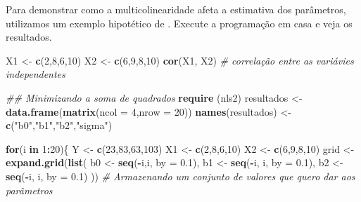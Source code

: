 \documentclass[
]{book}
\newenvironment{Shaded}{\begin{snugshade}}{\end{snugshade}}
\newcommand{\CommentTok}[1]{\textcolor[rgb]{0.56,0.35,0.01}{\textit{#1}}}
\newcommand{\ControlFlowTok}[1]{\textcolor[rgb]{0.13,0.29,0.53}{\textbf{#1}}}
\newcommand{\DataTypeTok}[1]{\textcolor[rgb]{0.13,0.29,0.53}{#1}}
\newcommand{\DecValTok}[1]{\textcolor[rgb]{0.00,0.00,0.81}{#1}}
\newcommand{\FloatTok}[1]{\textcolor[rgb]{0.00,0.00,0.81}{#1}}
\newcommand{\KeywordTok}[1]{\textcolor[rgb]{0.13,0.29,0.53}{\textbf{#1}}}
\newcommand{\NormalTok}[1]{#1}
\newcommand{\OperatorTok}[1]{\textcolor[rgb]{0.81,0.36,0.00}{\textbf{#1}}}
\newcommand{\StringTok}[1]{\textcolor[rgb]{0.31,0.60,0.02}{#1}}
\begin{document}
Para demonstrar como a multicolinearidade afeta a estimativa dos parâmetros, utilizamos um exemplo hipotético de \citet{Kutner2005}. Execute a programação em casa e veja os resultados.

\begin{Shaded}
\begin{Highlighting}[]
\NormalTok{X1 <-}\StringTok{ }\KeywordTok{c}\NormalTok{(}\DecValTok{2}\NormalTok{,}\DecValTok{8}\NormalTok{,}\DecValTok{6}\NormalTok{,}\DecValTok{10}\NormalTok{)}
\NormalTok{X2 <-}\StringTok{ }\KeywordTok{c}\NormalTok{(}\DecValTok{6}\NormalTok{,}\DecValTok{9}\NormalTok{,}\DecValTok{8}\NormalTok{,}\DecValTok{10}\NormalTok{)}
\KeywordTok{cor}\NormalTok{(X1, X2) }\CommentTok{# correlação entre as variávies independentes}

\CommentTok{## Minimizando a soma de quadrados}
\KeywordTok{require}\NormalTok{ (nls2)}
\NormalTok{resultados <-}\StringTok{ }\KeywordTok{data.frame}\NormalTok{(}\KeywordTok{matrix}\NormalTok{(}\DataTypeTok{ncol =} \DecValTok{4}\NormalTok{,}\DataTypeTok{nrow =} \DecValTok{20}\NormalTok{))}
\KeywordTok{names}\NormalTok{(resultados) <-}\StringTok{ }\KeywordTok{c}\NormalTok{(}\StringTok{"b0"}\NormalTok{,}\StringTok{"b1"}\NormalTok{,}\StringTok{"b2"}\NormalTok{,}\StringTok{"sigma"}\NormalTok{)}

\ControlFlowTok{for}\NormalTok{(i }\ControlFlowTok{in} \DecValTok{1}\OperatorTok{:}\DecValTok{20}\NormalTok{)\{}
\NormalTok{Y <-}\StringTok{ }\KeywordTok{c}\NormalTok{(}\DecValTok{23}\NormalTok{,}\DecValTok{83}\NormalTok{,}\DecValTok{63}\NormalTok{,}\DecValTok{103}\NormalTok{)}
\NormalTok{X1 <-}\StringTok{ }\KeywordTok{c}\NormalTok{(}\DecValTok{2}\NormalTok{,}\DecValTok{8}\NormalTok{,}\DecValTok{6}\NormalTok{,}\DecValTok{10}\NormalTok{)}
\NormalTok{X2 <-}\StringTok{ }\KeywordTok{c}\NormalTok{(}\DecValTok{6}\NormalTok{,}\DecValTok{9}\NormalTok{,}\DecValTok{8}\NormalTok{,}\DecValTok{10}\NormalTok{)}
\NormalTok{grid <-}\StringTok{ }\KeywordTok{expand.grid}\NormalTok{(}\KeywordTok{list}\NormalTok{(}
\NormalTok{b0 <-}\StringTok{ }\KeywordTok{seq}\NormalTok{(}\OperatorTok{-}\NormalTok{i,i, }\DataTypeTok{by =} \FloatTok{0.1}\NormalTok{),}
\NormalTok{b1 <-}\StringTok{ }\KeywordTok{seq}\NormalTok{(}\OperatorTok{-}\NormalTok{i, i, }\DataTypeTok{by =} \FloatTok{0.1}\NormalTok{),}
\NormalTok{b2 <-}\StringTok{ }\KeywordTok{seq}\NormalTok{(}\OperatorTok{-}\NormalTok{i, i, }\DataTypeTok{by =} \FloatTok{0.1}\NormalTok{)}
\NormalTok{)) }\CommentTok{# Armazenando um conjunto de valores que quero dar aos parâmetros}


\end{Highlighting}
\end{Shaded}
\end{document}
